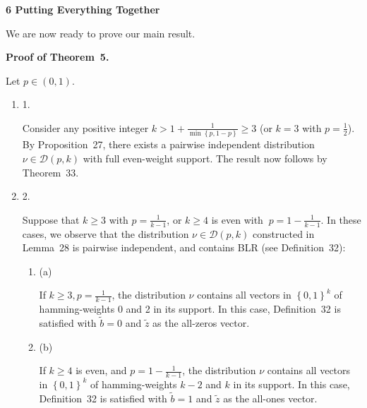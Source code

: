 \documentclass[10pt,a4paper]{article}
\begin{document}
\par\medskip\noindent\textbf{
6 Putting Everything Together}\par




We are now ready to prove our main result.\par




\par\medskip\noindent\textbf{Proof of Theorem 5.}\par




Let $p\in(0,1)$.\par




\begin{enumerate}


\item[] 
1. 


Consider any positive integer $k>1+\frac{1}{\min\left\{p,1-p\right\}}\geqslant 3$ (or $k=3$ with $p=\frac{1}{2}$).
By Proposition 27, there exists a pairwise independent distribution $\nu\in\mathcal{D}(p,k)$ with full even-weight support.
The result now follows by Theorem 33.\par





\item[] 
2. 


Suppose that $k\geqslant 3$ with $p=\frac{1}{k-1}$, or $k\geqslant 4$ is even with $\ p=1-\frac{1}{k-1}$.
In these cases, we observe that the distribution $\nu\in\mathcal{D}(p,k)$ constructed in Lemma 28 is pairwise independent, and contains BLR (see Definition 32):\par


\begin{enumerate}


\item[] 
(a) 


If $k\geqslant 3,p=\frac{1}{k-1}$, the distribution $\nu$ contains all vectors in $\left\{0,1\right\}^{k}$ of hamming-weights 0 and 2 in its support. In this case, Definition 32 is satisfied with $\tilde{b}=0$ and $\tilde{z}$ as the all-zeros vector.\par





\item[] 
(b) 


If $k\geqslant 4$ is even, and $p=1-\frac{1}{k-1}$, the distribution $\nu$ contains all vectors in $\left\{0,1\right\}^{k}$ of hamming-weights $k-2$ and $k$ in its support. In this case, Definition 32 is satisfied with $\tilde{b}=1$ and $\tilde{z}$ as the all-ones vector.\par






\end{enumerate}
\end{enumerate}
\end{document}
